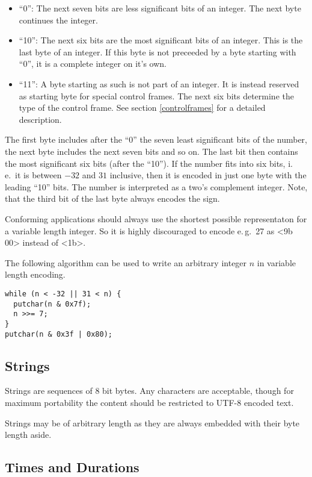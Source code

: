 \documentclass[DIV=10]{scrartcl}
\begin{document}
\begin{itemize}
\item “0”: The next seven bits are less significant bits of an integer.
The next byte continues the integer.
\item “10”: The next six bits are the most significant bits of an integer.
This is the last byte of an integer.
If this byte is not preceeded by a byte starting with “0”, it is a complete integer on it’s own.
\item “11”: A byte starting as such is not part of an integer.
It is instead reserved as starting byte for special control frames.
The next six bits determine the type of the control frame.
See section \ref{controlframes} for a detailed description.
\end{itemize}

The first byte includes after the “0” the seven least significant bits of the number, the next byte includes the next seven bits and so on.
The last bit then contains the most significant six bits (after the “10”).
If the number fits into six bits, i.\,e.\ it is between \(-32\) and \(31\) inclusive, then it is encoded in just one byte with the leading “10” bits.
The number is interpreted as a two’s complement integer.
Note, that the third bit of the last byte always encodes the sign.

Conforming applications should always use the shortest possible representaton for a variable length integer.
So it is highly discouraged to encode e.\,g.\ 27 as <9b 00> instead of <1b>.

The following algorithm can be used to write an arbitrary integer \(n\) in variable length encoding.

\begin{verbatim}
while (n < -32 || 31 < n) {
  putchar(n & 0x7f);
  n >>= 7;
}
putchar(n & 0x3f | 0x80);
\end{verbatim}

\subsection{Strings}

Strings are sequences of 8 bit bytes.
Any characters are acceptable, though for maximum portability the content should be restricted to UTF-8 encoded text.

Strings may be of arbitrary length as they are always embedded with their byte length aside.

\subsection{Times and Durations}
\end{document}
